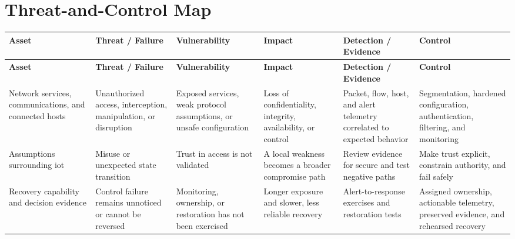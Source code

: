 \documentclass[11pt]{article}
\begin{document}
\section*{Threat-and-Control Map}
\begingroup\scriptsize\setlength{\tabcolsep}{2pt}
\begin{longtable}{>{\RaggedRight\arraybackslash}p{}>{\RaggedRight\arraybackslash}p{}>{\RaggedRight\arraybackslash}p{}>{\RaggedRight\arraybackslash}p{}>{\RaggedRight\arraybackslash}p{}>{\RaggedRight\arraybackslash}p{}}
\toprule\rowcolor{Navy}\color{white}\textbf{Asset} & \color{white}\textbf{Threat / Failure} & \color{white}\textbf{Vulnerability} & \color{white}\textbf{Impact} & \color{white}\textbf{Detection / Evidence} & \color{white}\textbf{Control}\\\midrule
\endfirsthead
\toprule\rowcolor{Navy}\color{white}\textbf{Asset} & \color{white}\textbf{Threat / Failure} & \color{white}\textbf{Vulnerability} & \color{white}\textbf{Impact} & \color{white}\textbf{Detection / Evidence} & \color{white}\textbf{Control}\\\midrule
\endhead
Network services, communications, and connected hosts & Unauthorized access, interception, manipulation, or disruption & Exposed services, weak protocol assumptions, or unsafe configuration & Loss of confidentiality, integrity, availability, or control & Packet, flow, host, and alert telemetry correlated to expected behavior & Segmentation, hardened configuration, authentication, filtering, and monitoring\\\midrule
Assumptions surrounding iot & Misuse or unexpected state transition & Trust in access is not validated & A local weakness becomes a broader compromise path & Review evidence for secure and test negative paths & Make trust explicit, constrain authority, and fail safely\\\midrule
Recovery capability and decision evidence & Control failure remains unnoticed or cannot be reversed & Monitoring, ownership, or restoration has not been exercised & Longer exposure and slower, less reliable recovery & Alert-to-response exercises and restoration tests & Assigned ownership, actionable telemetry, preserved evidence, and rehearsed recovery\\\midrule
\bottomrule
\end{longtable}
\endgroup
\end{document}
